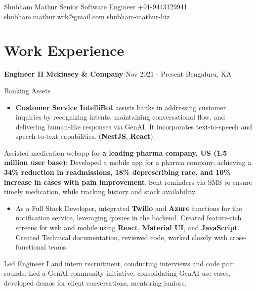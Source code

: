 \documentclass[letterpaper]{resume_config}
\begin{document}
\Header
    {Shubham Mathur} %
    {Senior Software Engineer}
    {+91-9443129941} %
    {shubham.mathur.wrk@gmail.com} %
    {shubham-mathur-biz} %

\section{\textcolor{NavyBlue}{Work Experience}}

\WorkExperience
    {\textbf{Engineer II}} %
    {\textbf{Mckinsey \& Company}} %
    {Nov 2021 - Present} %
    {Bengaluru, KA} %
    {
    \item{Banking Assets}
        \begin{itemize}
          \item{\textbf{Customer Service IntelliBot} assists banks in addressing customer inquiries by recognizing intents, maintaining conversational flow, and delivering human-like responses via GenAI. It incorporates text-to-speech and speech-to-text capabilities. (\textbf{NestJS}, \textbf{React}).}
        \end{itemize}
    \item{Assisted medication webapp for \textbf{a leading pharma company, US (1.5 million user base)}: Developed a mobile app for a pharma company, achieving a \textbf{34\% reduction in readmissions, 18\% deprescribing rate, and 10\% increase in cases with pain improvement}. Sent reminders via SMS to ensure timely medication, while tracking history and stock availability.}
    
    \begin{itemize}
        \item{As a Full Stack Developer, integrated \textbf{Twilio} and \textbf{Azure} functions for the notification service, leveraging queues in the backend. Created feature-rich screens for web and mobile using \textbf{React}, \textbf{Material UI}, and \textbf{JavaScript}. Created Technical documentation, reviewed code, worked closely with cross-functional teams.}

    \end{itemize}
        \item Led Engineer I and intern recruitment, conducting interviews and code pair rounds. Led a GenAI community initiative, consolidating GenAI use cases, developed demos for client conversations, mentoring juniors.
    } 
\end{document}
